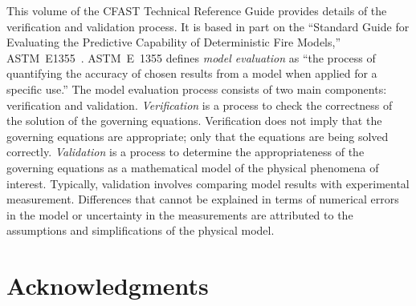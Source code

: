 \documentclass[12pt]{book}
\begin{document}
This volume of the CFAST Technical Reference Guide provides details of the verification and validation process. It is based in part on the ``Standard Guide for Evaluating the Predictive Capability of Deterministic Fire Models,'' ASTM~E1355~\cite{CFAST:ASTM:E1355}. ASTM~E~1355 defines {\em model evaluation} as ``the process of quantifying the accuracy of chosen results from a model when applied for a specific use.'' The model evaluation process consists of two main components: verification and validation. {\em Verification} is a process to check the correctness of the solution of the governing equations. Verification does not imply that the governing equations are appropriate; only that the equations are being solved correctly. {\em Validation} is a process to determine the appropriateness of the governing equations as a mathematical model of the physical phenomena of interest. Typically, validation involves comparing model results with experimental measurement. Differences that cannot be explained in terms of numerical errors in the model or uncertainty in the measurements are attributed to the assumptions and simplifications of the physical model.


\chapter{Acknowledgments}

\label{acksection}
\end{document}
